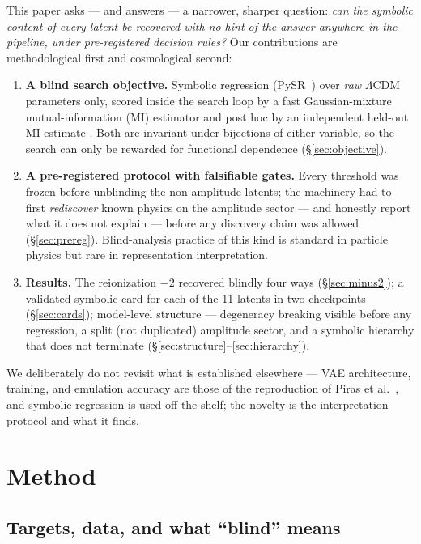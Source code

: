 \documentclass[twocolumn,10pt]{article}
\begin{document}
This paper asks --- and answers --- a narrower, sharper question: \emph{can the
symbolic content of every latent be recovered with no hint of the answer
anywhere in the pipeline, under pre-registered decision rules?} Our
contributions are methodological first and cosmological second:

\begin{enumerate}\itemsep2pt
\item \textbf{A blind search objective.} Symbolic regression
  (PySR~\cite{cranmer2023}) over \emph{raw} $\Lambda$CDM parameters only, scored
  inside the search loop by a fast Gaussian-mixture mutual-information (MI)
  estimator and post hoc by an independent held-out MI estimate
  \citep{piras2023}. Both are invariant under bijections of either variable, so
  the search can only be rewarded for functional dependence
  (\S\ref{sec:objective}).
\item \textbf{A pre-registered protocol with falsifiable gates.} Every
  threshold was frozen before unblinding the non-amplitude latents; the
  machinery had to first \emph{rediscover} known physics on the amplitude
  sector --- and honestly report what it does not explain --- before any
  discovery claim was allowed (\S\ref{sec:prereg}). Blind-analysis practice of
  this kind is standard in particle physics \citep{klein2005} but rare in
  representation interpretation.
\item \textbf{Results.} The reionization $-2$ recovered blindly four ways
  (\S\ref{sec:minus2}); a validated symbolic card for each of the 11 latents in
  two checkpoints (\S\ref{sec:cards}); model-level structure --- degeneracy
  breaking visible before any regression, a split (not duplicated) amplitude
  sector, and a symbolic hierarchy that does not terminate
  (\S\ref{sec:structure}--\ref{sec:hierarchy}).
\end{enumerate}

We deliberately do not revisit what is established elsewhere --- VAE
architecture, training, and emulation accuracy are those of the reproduction
of Piras et al.~\cite{piras2025}, and symbolic regression
\citep{schmidt2009,cranmer2020} is used off the shelf; the novelty is the
interpretation protocol and what it finds.

\section{Method}
\label{sec:method}

\subsection{Targets, data, and what ``blind'' means}
\label{sec:setup}
\end{document}
